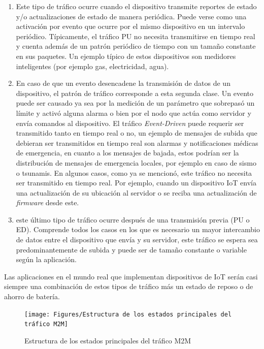 \begin{enumerate}
    \item {}\textit{}\underbar{):} Este tipo de tráfico ocurre cuando el dispositivo transmite reportes de estado y/o actualizaciones de estado de manera periódica. Puede verse como una activación por evento que ocurre por el mismo dispositivo en un intervalo periódico. Típicamente, el tráfico PU no necesita transmitirse en tiempo real y cuenta además de un patrón periódico de tiempo con un tamaño constante en sus paquetes. Un ejemplo típico de estos dispositivos son medidores inteligentes (por ejemplo gas, electricidad, agua).
    \item {}\textit{}\underbar{):} En caso de que un evento desencadene la transmisión de datos de un dispositivo, el patrón de tráfico corresponde a esta segunda clase. Un evento puede ser causado ya sea por la medición de un parámetro que sobrepasó un límite y activó alguna alarma o bien por el nodo que actúa como servidor y envía comandos al dispositivo. El tráfico \textit{Event-Driven} puede requerir ser transmitido tanto en tiempo real o no, un ejemplo de mensajes de subida que debieran ser transmitidos en tiempo real son alarmas y notificaciones médicas de emergencia, en cuanto a los mensajes de bajada, estos podrían ser la distribución de mensajes de emergencia locales, por ejemplo en caso de sismo o tsunamis. En algunos casos, como ya se mencionó, este tráfico no necesita ser transmitido en tiempo real. Por ejemplo, cuando un dispositivo IoT envía una actualización de su ubicación al servidor o se reciba una actualización de \textit{firmware }desde este.
    \item {}\textit{}\underbar{):} este último tipo de tráfico ocurre después de una transmisión previa (PU o ED). Comprende todos los casos en los que es necesario un mayor intercambio de datos entre el dispositivo que envía y su servidor, este tráfico se espera sea predominantemente de subida y puede ser de tamaño constante o variable según la aplicación.
\end{enumerate}

Las aplicaciones en el mundo real que implementan dispositivos de IoT serán casi siempre una combinación de estos tipos de tráfico más un estado de reposo o de ahorro de batería.
\begin{figure}[th]
\centering
\texttt{[image: Figures/Estructura de los estados principales del tráfico M2M]}
\decoRule
\caption[Estructura de los estados principales del tráfico M2M]{Estructura de los estados principales del tráfico M2M}
\label{fig:}
\end{figure}

